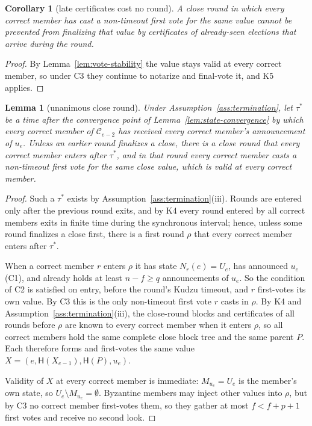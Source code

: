 \documentclass[11pt]{article}
\newtheorem{lemma}{Lemma}
\newtheorem{corollary}{Corollary}
\theoremstyle{remark}
\newcommand{\C}{\mathcal{C}}
\newcommand{\hash}{\mathsf{H}}
\begin{document}
\begin{corollary}[late certificates cost no round]
\label{cor:no-lost-round}
A close round in which every correct member has cast a non-timeout first vote for the same value cannot be prevented from finalizing that value by certificates of already-seen elections that arrive during the round.
\end{corollary}

\begin{proof}
By Lemma~\ref{lem:vote-stability} the value stays valid at every correct member, so under C3 they continue to notarize and final-vote it, and K5 applies.
\end{proof}

\begin{lemma}[unanimous close round]
\label{lem:unanimous-round}
Under Assumption~\ref{ass:termination}, let $\tau^*$ be a time after the convergence point of Lemma~\ref{lem:state-convergence} by which every correct member of $\C_{e-2}$ has received every correct member's announcement of $u_e$. Unless an earlier round finalizes a close, there is a close round that every correct member enters after $\tau^*$, and in that round every correct member casts a non-timeout first vote for the same close value, which is valid at every correct member.
\end{lemma}

\begin{proof}
Such a $\tau^*$ exists by Assumption~\ref{ass:termination}(iii). Rounds are entered only after the previous round exits, and by K4 every round entered by all correct members exits in finite time during the synchronous interval; hence, unless some round finalizes a close first, there is a first round $\rho$ that every correct member enters after $\tau^*$.

When a correct member $r$ enters $\rho$ it has state $N_r(e)=U_e$, has announced $u_e$ (C1), and already holds at least $n-f\ge q$ announcements of $u_e$. So the condition of C2 is satisfied on entry, before the round's Kudzu timeout, and $r$ first-votes its own value. By C3 this is the only non-timeout first vote $r$ casts in $\rho$. By K4 and Assumption~\ref{ass:termination}(iii), the close-round blocks and certificates of all rounds before $\rho$ are known to every correct member when it enters $\rho$, so all correct members hold the same complete close block tree and the same parent $P$. Each therefore forms and first-votes the same value $X=(e,\hash(X_{e-1}),\hash(P),u_e)$.

Validity of $X$ at every correct member is immediate: $M_{u_e}=U_e$ is the member's own state, so $U_e\setminus M_{u_e}=\emptyset$. Byzantine members may inject other values into $\rho$, but by C3 no correct member first-votes them, so they gather at most $f<f+p+1$ first votes and receive no second look.
\end{proof}
\end{document}
